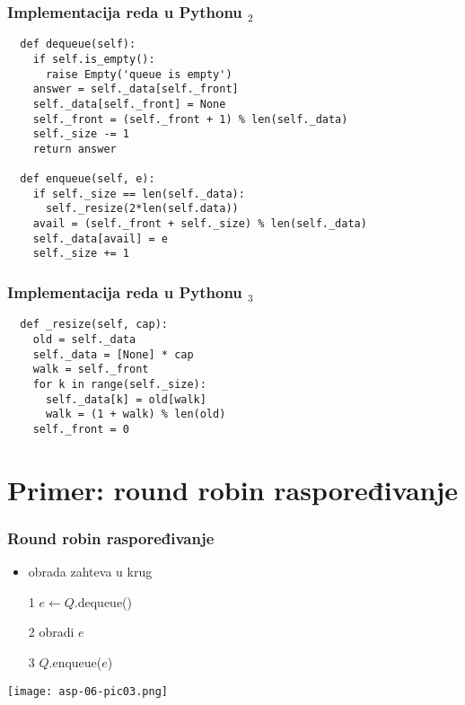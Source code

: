 \documentclass[compress,aspectratio=169]{beamer}
\begin{document}
\begin{frame}[fragile,shrink=10]
  \frametitle{Implementacija reda u Pythonu $_2$}
\begin{verbatim}
  def dequeue(self):
    if self.is_empty():
      raise Empty('queue is empty')
    answer = self._data[self._front]
    self._data[self._front] = None
    self._front = (self._front + 1) % len(self._data)
    self._size -= 1
    return answer

  def enqueue(self, e):
    if self._size == len(self._data):
      self._resize(2*len(self.data))
    avail = (self._front + self._size) % len(self._data)
    self._data[avail] = e
    self._size += 1
\end{verbatim}
\end{frame}

\begin{frame}[fragile,shrink=10]
  \frametitle{Implementacija reda u Pythonu $_3$}
\begin{verbatim}
  def _resize(self, cap):
    old = self._data
    self._data = [None] * cap
    walk = self._front
    for k in range(self._size):
      self._data[k] = old[walk]
      walk = (1 + walk) % len(old)
    self._front = 0 
\end{verbatim}
\end{frame}

\section[P: Round Robin]{Primer: round robin raspoređivanje}
\begin{frame}[fragile]
  \frametitle{Round robin raspoređivanje}
  \begin{itemize}
    \item obrada zahteva u krug
    \item[1] $e \leftarrow Q$.dequeue()
    \item[2] obradi $e$
    \item[3] $Q$.enqueue($e$)
  \end{itemize}
\begin{center}
  \texttt{[image: asp-06-pic03.png]}
\end{center}
\end{frame}
\end{document}

